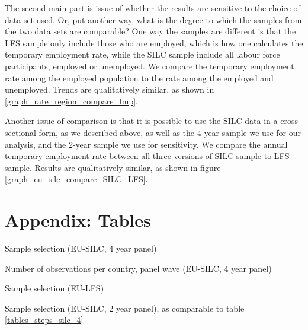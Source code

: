 The second main part is issue of whether the results are sensitive to the choice of data set used.  Or, put another way, what is the degree to which the samples from the two data sets are comparable?  One way the samples are different is that the LFS sample only include those who are employed, which is how one calculates the temporary employment rate, while the SILC sample include all labour force participants, employed or unemployed.  We compare the temporary employment rate among the employed population to the rate among the employed and unemployed.  Trends are qualitatively similar, as shown in \ref{graph_rate_region_compare_lmp}.  

Another issue of comparison is that it is possible to use the SILC data in a cross-sectional form, as we described above, as well as the 4-year sample we use for our analysis, and the 2-year sample we use for sensitivity.  We compare the annual temporary employment rate between all three versions of SILC sample to LFS sample.  Results are qualitatively similar, as shown in figure \ref{graph_eu_silc_compare_SILC_LFS}.  


\clearpage
\section{Appendix: Tables}
\label{appendix_tables}

\begin{table}[h!]	
	\caption{Sample selection (EU-SILC, 4 year panel)}
    \resizebox{\textwidth}{!}{}
    \label{tables_steps_silc_4}
\end{table}

\begin{table}
    \caption{Number of observations per country, panel wave (EU-SILC, 4 year panel)}
    \footnotesize
    \resizebox{\textwidth}{!}{}
    \label{table_country_panel_years}
\end{table}

\begin{table}[h!]   
    \caption{Sample selection (EU-LFS)}
    \resizebox{\textwidth}{!}{}
    \label{tables_steps_lfs}
\end{table}

\begin{table}[h!]	
	\caption{Sample selection (EU-SILC, 2 year panel), as comparable to table \ref{tables_steps_silc_4}}
    \resizebox{\textwidth}{!}{}
    \label{tables_steps_silc_2}
\end{table}

